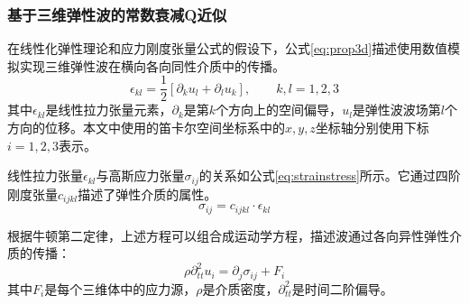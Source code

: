 \subsubsection{基于三维弹性波的常数衰减Q近似}

在线性化弹性理论和应力刚度张量公式的假设下\cite{landau1986theory}，公式\ref{eq:prop3d}描述使用数值模拟实现三维弹性波在横向各向同性介质中的传播。
\begin{equation}
  \epsilon_{kl} = \frac{1}{2}\left[ \partial_k u_l + \partial_l u_k\right], \quad\quad k,l = 1,2,3
  \label{eq:prop3d}
\end{equation}
其中$\epsilon_{kl}$是线性拉力张量元素，$\partial_k$是第$k$个方向上的空间偏导，$u_l$是弹性波波场第$l$个方向的位移。本文中使用的笛卡尔空间坐标系中的$x, y, z$坐标轴分别使用下标$i=1, 2, 3$表示。

线性拉力张量$\epsilon_{kl}$与高斯应力张量$\sigma_{ij}$的关系如公式\ref{eq:strainstress}所示。它通过四阶刚度张量$c_{ijkl}$描述了弹性介质的属性。
\begin{equation}
  \sigma_{ij} = c_{ijkl}\cdot \epsilon_{kl}
  \label{eq:strainstress}
\end{equation}

根据牛顿第二定律，上述方程可以组合成运动学方程，描述波通过各向异性弹性介质的传播：
\begin{equation}
  \rho \partial_{tt}^2u_i=\partial_j \sigma_{ij}+F_i
  \label{eq:partialtt}
\end{equation}
其中$F_i$是每个三维体中的应力源，$\rho$是介质密度，$\partial_{tt}^2$是时间二阶偏导。

